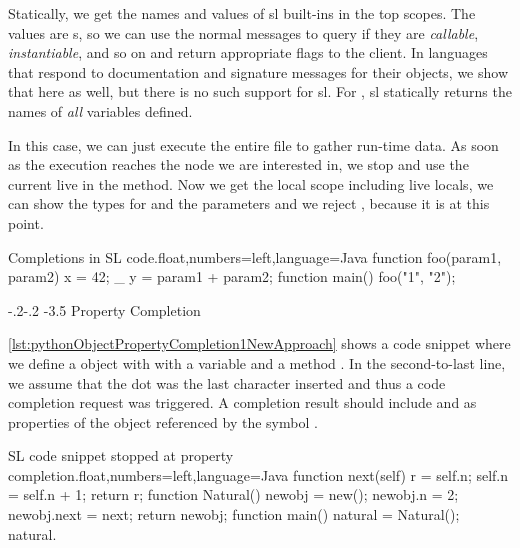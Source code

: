 \documentclass[sigplan,10pt,screen]{acmart}
\makeatletter
\renewcommand\subparagraph{\@startsection{subparagraph}{5}{\z@}%
   {-.2\baselineskip \@plus -2\p@ \@minus -.2\p@}%
   {-3.5\p@}%
   {\@subparfont\@addspaceafter}}
\makeatother
\begin{document}
Statically, we get the names and values of \ac{sl} built-ins in the top
scopes. The values are s, so we can use the normal
 messages to query if they are \emph{callable},
\emph{instantiable}, and so on and return appropriate flags to the client. In
languages that respond to documentation and signature messages for their
objects, we show that here as well, but there is no such support for
\ac{sl}. For , \ac{sl} statically returns the names
of \emph{all} variables defined. %

In this case, we can just execute the entire file to gather run-time
data. As soon as the execution reaches the node we are interested in, we stop
and use the current live  in the 
method. Now we get the local scope including live locals, we can show the types
for  and the parameters and we reject , because it
is  at this point.

\begin{code}{Completions in SL code.}{float,numbers=left,language=Java}
function foo(param1, param2) {
    x = 42;
    _
    y = param1 + param2;
}
function main() { foo("1", "2"); }
\end{code}

\subparagraph{Property Completion}
\label{sec:newApproachCompletionProperties}

\autoref{lst:pythonObjectPropertyCompletion1NewApproach} shows a code snippet
where we define a  object with with a variable
 and a method . In the second-to-last line, we
assume that the dot was the last character inserted and thus a code completion
request was triggered. A completion result should include  and
 as properties of the object referenced by the symbol
.

\begin{code}{SL code snippet stopped at property completion.}{float,numbers=left,language=Java}
function next(self) {
    r = self.n;
    self.n = self.n + 1;
    return r;
}
function Natural() {
    newobj = new();
    newobj.n = 2;
    newobj.next = next;
    return newobj;
}
function main() {
    natural = Natural();
    natural.
}
\end{code}
\end{document}
